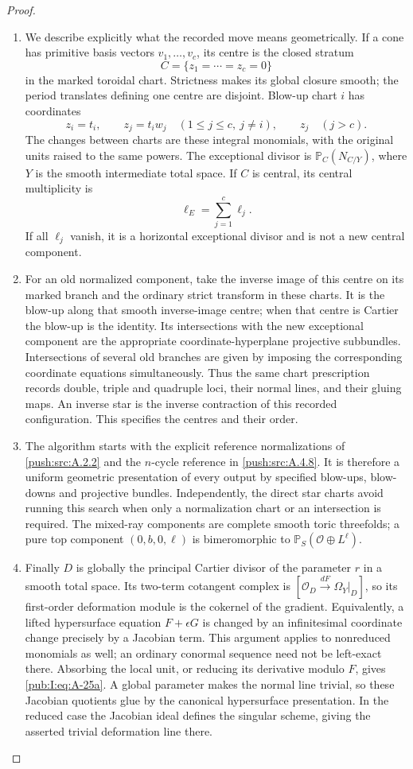 \begin{proof}
\begin{enumerate}[label=\arabic*.,leftmargin=*]
\item We describe explicitly what the recorded move means
geometrically. If a cone has primitive basis vectors
$v_1,\ldots,v_c$, its centre is the closed stratum
\[
 C=\{z_1=\cdots=z_c=0\}
\]
in the marked toroidal chart. Strictness makes its
global closure smooth; the period translates defining
one centre are disjoint. Blow-up chart $i$ has
coordinates
\[
 z_i=t_i,\qquad z_j=t_i w_j\quad
 (1\leq j\leq c,\ j\ne i),
 \qquad z_j\quad(j>c).
\]
The changes between charts are these integral
monomials, with the original units raised to the
same powers. The exceptional divisor is
$\mathbb P_C(N_{C/Y})$, where $Y$ is the smooth
intermediate total space. If $C$ is central, its
central multiplicity is
\[
 \ell_E=\sum_{j=1}^c\ell_j.
\]
If all $\ell_j$ vanish, it is a horizontal exceptional
divisor and is not a new central component.

\item For an old normalized component, take the inverse
image of this centre on its marked branch and the
ordinary strict transform in these charts. It is
the blow-up along that smooth inverse-image centre;
when that centre is Cartier the blow-up is the
identity. Its intersections with the new exceptional
component are the appropriate coordinate-hyperplane
projective subbundles. Intersections of several old
branches are given by imposing the corresponding
coordinate equations simultaneously. Thus the same
chart prescription records double, triple and
quadruple loci, their normal lines, and their 
gluing maps. An inverse star is the inverse
contraction of this recorded configuration. This
specifies the centres and their order.

\item The algorithm starts with the explicit reference
normalizations of \ref{push:src:A.2.2} and the $n$-cycle reference
in \ref{push:src:A.4.8}. It is therefore a uniform geometric
presentation of every output by specified blow-ups,
blow-downs and projective bundles. Independently,
the direct star charts avoid running this search
when only a normalization chart or an intersection
is required. The mixed-ray components are complete
smooth toric threefolds; a pure top component
$(0,b,0,\ell)$ is bimeromorphic to
$\mathbb P_S(\mathcal O\oplus L^\ell)$.

\item Finally $D$ is globally the principal Cartier
divisor of the parameter $r$ in a smooth total
space. Its two-term cotangent complex is
$[\mathcal O_D\xrightarrow{dF}\Omega_Y|_D]$,
so its first-order deformation module is the
cokernel of the gradient. Equivalently, a lifted
hypersurface equation $F+\epsilon G$ is changed by
an infinitesimal coordinate change precisely by a
Jacobian term. This argument applies to nonreduced
monomials as well; an ordinary conormal sequence
need not be left-exact there. Absorbing the local unit, or reducing its
derivative modulo $F$, gives \eqref{pub:I:eq:A-25a}. A global
parameter makes the normal line trivial, so these
Jacobian quotients glue by the canonical
hypersurface presentation. In the reduced case
the Jacobian ideal defines the singular scheme,
giving the asserted trivial deformation line there.


\end{enumerate}
\end{proof}
